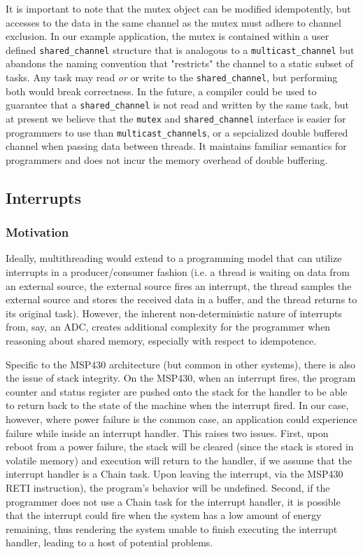 \documentclass[11pt]{sensys-proc}
\newcommand{\chain}{Chain\xspace}
\begin{document}
It is important to note that the mutex object can be modified idempotently, but
accesses to the data in the same channel as the mutex must adhere to channel
exclusion. In our example application, the mutex is contained within a user
defined \texttt{shared\_channel} structure that is analogous to a
\texttt{multicast\_channel} but abandons the naming convention that "restricts"
the channel to a static subset of tasks. Any task may read {\em or} or write to
the \texttt{shared\_channel}, but performing both would break correctness. In
the future, a compiler could be used to guarantee that a
\texttt{shared\_channel} is not read and written by the same task, but at
present we believe that the \texttt{mutex} and \texttt{shared\_channel}
interface is easier for programmers to use than \texttt{multicast\_channels}, or
a sepcialized double buffered channel when passing data between threads. It
maintains familiar semantics for programmers and does not incur the memory
overhead of double buffering.


\subsection{Interrupts}
\subsubsection{Motivation}
Ideally, multithreading would extend to a programming model that can utilize
interrupts in a producer/consumer fashion (i.e. a thread is waiting on data
from an external source, the external source fires an interrupt, the thread
samples the external source and stores the received data in a buffer, and
the thread returns to its original task). However, the inherent
non-deterministic
nature of interrupts from, say, an ADC, creates additional complexity for the
programmer when reasoning about shared memory, especially with respect to
idempotence.


    Specific to the MSP430 architecture (but common in other systems), there is
also the issue of stack integrity. On the MSP430, when an interrupt fires,
the program counter and status register are pushed onto the stack for
the handler to be able to return back to the state of the machine when the
interrupt fired. In our case, however, where power failure is the common
case, an application could experience failure while inside an interrupt
handler. This raises two issues. First, upon reboot from a power failure,
the stack will be cleared (since the stack is stored in volatile memory) and
execution will return to the handler, if we assume that the interrupt handler
is a \chain task. Upon leaving the interrupt, via the MSP430 RETI instruction),
the program's behavior will be undefined. Second, if the programmer does not
use a \chain task for the interrupt handler, it is possible that the interrupt
could fire when the system has a low amount of energy remaining, thus
rendering the system unable to finish executing the interrupt handler,
leading to a host of potential problems.
\end{document}
